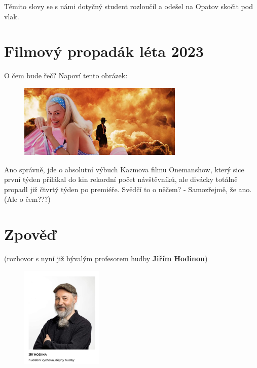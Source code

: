 \documentclass[twoside, 11pt]{article}
\begin{document}
Těmito slovy se s námi dotyčný student rozloučil a odešel na Opatov skočit pod vlak.
\vspace*{-24pt}
\section*{Filmový propadák léta 2023}
\vspace*{-18pt}
O čem bude řeč? Napoví tento obrázek:

\begin{figure}[htbp]
    \centering
    \includegraphics[width=0.7\textwidth]{barbie}
\end{figure}
\vspace*{-12pt}
{\scriptsize Ano správně, jde o absolutní výbuch Kazmova filmu Onemanshow, který sice první týden přilákal do kin rekordní počet návštěvníků, ale divácky totálně propadl již čtvrtý týden po premiéře. Svědčí to o něčem? - Samozřejmě, že ano. (Ale o čem???)}
\clearpage

\section*{Zpověď}
(rozhovor s nyní již bývalým profesorem hudby \textbf{Jiřím Hodinou})

\begin{figure}
    \vspace*{-24pt}
    \includegraphics[width=0.35\textwidth]{hodina}
\end{figure}
\end{document}
